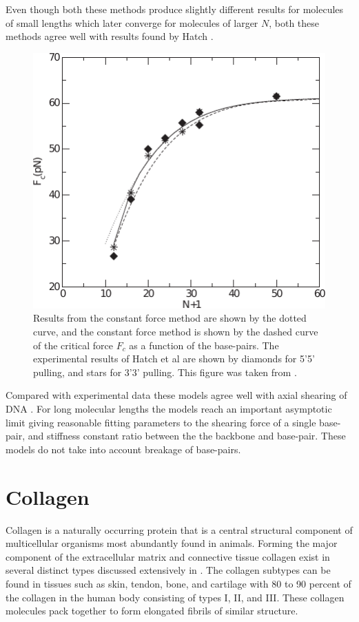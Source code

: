 Even though both these methods produce slightly different results for molecules of small lengths which later converge for molecules of larger $N$, both these methods agree well with results found by Hatch \cite{Prakash2011}. 
%
\begin{figure}[H]
\centering
\includegraphics[scale=1.5]{Graphics/DNA/fig6_Prakash2011.pdf}
\caption{Results from the constant force method are shown by the dotted curve, and the constant force method is shown by the dashed curve of the critical force $F_{c}$ as a function of the base-pairs. The experimental results of Hatch et al are shown by diamonds for 5'5' pulling, and stars for 3'3' pulling. This figure was taken from \cite{Prakash2011}.}
\label{fig:fig6_Prakash2011}
\end{figure}
%
Compared with experimental data \cite{Prakash2011,Hatch2008} these models agree well with axial shearing of DNA . For long molecular lengths the models reach an important asymptotic limit giving reasonable fitting parameters to the shearing force of a single base-pair, and stiffness constant ratio between the the backbone and base-pair. These models do not take into account breakage of base-pairs.

\newpage
\section{Collagen}

Collagen is a naturally occurring protein that is a central structural component of multicellular organisms most abundantly found in animals. Forming the major component of the extracellular matrix and connective tissue collagen exist in several distinct types discussed extensively in \cite{Shoulders2009,Fratzl2008,Berg2010,Brinckmann2005}. The collagen subtypes can be found in tissues such as skin, tendon, bone, and cartilage with 80 to 90 percent of the collagen in the human body consisting of types I, II, and III. These collagen molecules pack together to form elongated fibrils of similar structure.  

